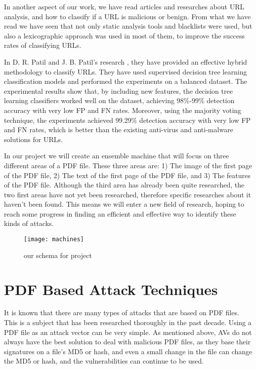 \documentclass{article}
\begin{document}
\indent In another aspect of our work, we have read articles and researches about URL analysis, and how to classify if a URL is malicious or benign. From what we have read we have seen that not only static analysis tools and blacklists were used, but also a lexicographic approach was used in most of them, to improve the success rates of classifying URLs. 

\clearpage
\newpage

\indent In D. R. Patil and J. B. Patil’s research \cite{patil2018malicious}, they have provided an effective hybrid methodology to classify URLs. They have used supervised decision tree learning classification models and performed the experiments on a balanced dataset. The experimental results show that, by including new features, the decision tree learning classifiers worked well on the dataset, achieving 98\%-99\% detection accuracy with very low FP and FN rates. Moreover, using the majority voting technique, the experiments achieved 99.29\% detection accuracy with very low FP and FN rates, which is better than the existing anti-virus and anti-malware solutions for URLs.

\indent In our project we will create an ensemble machine that will focus on three different areas of a PDF file. These three areas are: 1) The image of the first page of the PDF file, 2) The text of the first page of the PDF file, and 3) The features of the PDF file. Although the third area has already been quite researched, the two first areas have not yet been researched, therefore specific researches about it haven't been found. This means we will enter a new field of research, hoping to reach some progress in finding an efficient and effective way to identify these kinds of attacks. 

\begin{figure}[h]
    \centering
    \texttt{[image: machines]}
    \\
    \caption{our schema for project}
    \label{fig:machines}
\end{figure}
\section[PDF Based Attack Techniques]{PDF Based Attack Techniques \cite{BGU2014malicious}}
\indent	It is known that there are many types of attacks that are based on PDF files. This is a subject that has been researched thoroughly in the past decade. Using a PDF file as an attack vector can be very simple. As mentioned above, AVs do not always have the best solution to deal with malicious PDF files, as they base their signatures on a file’s MD5 or hash, and even a small change in the file can change the MD5 or hash, and the vulnerabilities can continue to be used.
\end{document}

